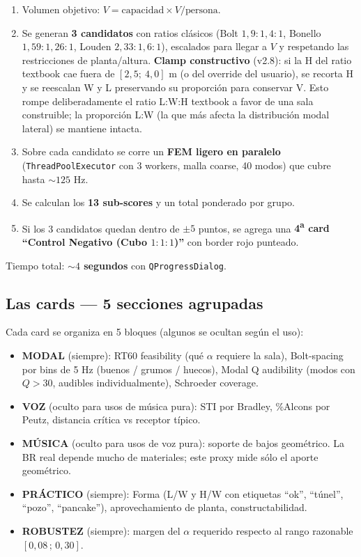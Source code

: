 \documentclass[11pt, a4paper]{article}
\begin{document}
\begin{enumerate}
  \item Volumen objetivo: $V = \text{capacidad} \times V/\text{persona}$.
  \item Se generan \textbf{3 candidatos} con ratios clásicos
        (Bolt $1{,}9{:}1{,}4{:}1$, Bonello $1{,}59{:}1{,}26{:}1$,
        Louden $2{,}33{:}1{,}6{:}1$), escalados para llegar a $V$ y
        respetando las restricciones de planta/altura. \textbf{Clamp
        constructivo} (v2.8): si la H del ratio textbook cae fuera de
        $[2{,}5;\ 4{,}0]$ m (o del override del usuario), se recorta H y
        se reescalan W y L preservando su proporción para conservar V.
        Esto rompe deliberadamente el ratio L:W:H textbook a favor de
        una sala construible; la proporción L:W (la que más afecta la
        distribución modal lateral) se mantiene intacta.
  \item Sobre cada candidato se corre un \textbf{FEM ligero en
        paralelo} (\texttt{ThreadPoolExecutor} con 3 workers, malla
        coarse, 40 modos) que cubre hasta $\sim 125$ Hz.
  \item Se calculan los \textbf{13 sub-scores} y un total ponderado
        por grupo.
  \item Si los 3 candidatos quedan dentro de $\pm 5$ puntos, se agrega
        una \textbf{4\textsuperscript{a} card ``Control Negativo
        (Cubo $1{:}1{:}1$)''} con border rojo punteado.
\end{enumerate}

Tiempo total: \textbf{$\sim 4$ segundos} con \texttt{QProgressDialog}.

\subsection{Las cards --- 5 secciones agrupadas}

Cada card se organiza en 5 bloques (algunos se ocultan según el uso):

\begin{itemize}
  \item \textbf{MODAL} (siempre): RT60 feasibility (qué $\alpha$
        requiere la sala), Bolt-spacing por bins de 5 Hz (buenos /
        grumos / huecos), Modal Q audibility (modos con $Q > 30$,
        audibles individualmente), Schroeder coverage.
  \item \textbf{VOZ} (oculto para usos de música pura): STI por
        Bradley, \%Alcons por Peutz, distancia crítica vs receptor
        típico.
  \item \textbf{MÚSICA} (oculto para usos de voz pura): soporte de
        bajos geométrico. La BR real depende mucho de materiales;
        este proxy mide sólo el aporte geométrico.
  \item \textbf{PRÁCTICO} (siempre): Forma (L/W y H/W con etiquetas
        ``ok'', ``túnel'', ``pozo'', ``pancake''), aprovechamiento de
        planta, constructabilidad.
  \item \textbf{ROBUSTEZ} (siempre): margen del $\alpha$ requerido
        respecto al rango razonable $[0{,}08\,;\,0{,}30]$.
\end{itemize}
\end{document}
